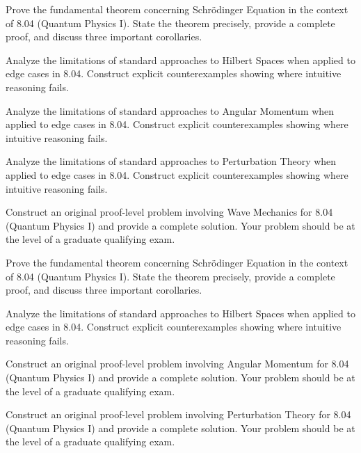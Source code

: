 \documentclass[12pt,a4paper]{exam}
\begin{document}
\begin{questions}
\vspace{0.3cm}

\question[7]
Prove the fundamental theorem concerning Schrödinger Equation in the context of 8.04 (Quantum Physics I). State the theorem precisely, provide a complete proof, and discuss three important corollaries.

\vspace{0.3cm}

\question[3]
Analyze the limitations of standard approaches to Hilbert Spaces when applied to edge cases in 8.04. Construct explicit counterexamples showing where intuitive reasoning fails.

\vspace{0.3cm}

\question[4]
Analyze the limitations of standard approaches to Angular Momentum when applied to edge cases in 8.04. Construct explicit counterexamples showing where intuitive reasoning fails.

\vspace{0.3cm}

\question[4]
Analyze the limitations of standard approaches to Perturbation Theory when applied to edge cases in 8.04. Construct explicit counterexamples showing where intuitive reasoning fails.

\vspace{0.3cm}

\question[2]
Construct an original proof-level problem involving Wave Mechanics for 8.04 (Quantum Physics I) and provide a complete solution. Your problem should be at the level of a graduate qualifying exam.

\vspace{0.3cm}

\question[4]
Prove the fundamental theorem concerning Schrödinger Equation in the context of 8.04 (Quantum Physics I). State the theorem precisely, provide a complete proof, and discuss three important corollaries.

\vspace{0.3cm}

\question[2]
Analyze the limitations of standard approaches to Hilbert Spaces when applied to edge cases in 8.04. Construct explicit counterexamples showing where intuitive reasoning fails.

\vspace{0.3cm}

\question[5]
Construct an original proof-level problem involving Angular Momentum for 8.04 (Quantum Physics I) and provide a complete solution. Your problem should be at the level of a graduate qualifying exam.

\vspace{0.3cm}

\question[4]
Construct an original proof-level problem involving Perturbation Theory for 8.04 (Quantum Physics I) and provide a complete solution. Your problem should be at the level of a graduate qualifying exam.

\vspace{0.3cm}

\end{questions}
\end{document}
